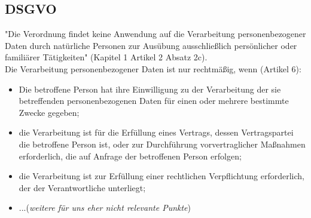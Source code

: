 \subsection{DSGVO}
 \cite{union2016verordnung}
"Die Verordnung findet keine Anwendung auf die Verarbeitung personenbezogener Daten  durch natürliche Personen zur Ausübung ausschließlich persönlicher oder familiärer Tätigkeiten" (Kapitel 1 Artikel 2 Absatz 2c).  \\



Die Verarbeitung personenbezogener Daten ist nur rechtmäßig, wenn (Artikel 6): 
\begin{itemize}
\item 	Die betroffene Person hat ihre Einwilligung zu der Verarbeitung der sie betreffenden personenbezogenen Daten für einen oder mehrere bestimmte Zwecke gegeben;
\item die Verarbeitung ist für die Erfüllung eines Vertrags, dessen Vertragspartei die betroffene Person ist, oder zur Durchführung vorvertraglicher Maßnahmen erforderlich, die auf Anfrage der betroffenen Person erfolgen;
\item die Verarbeitung ist zur Erfüllung einer rechtlichen Verpflichtung erforderlich, der der Verantwortliche unterliegt;
\item ...(\textit{weitere für uns eher nicht relevante Punkte})
\end{itemize}
 


